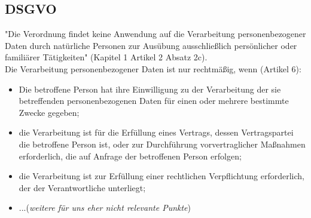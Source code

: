 \subsection{DSGVO}
 \cite{union2016verordnung}
"Die Verordnung findet keine Anwendung auf die Verarbeitung personenbezogener Daten  durch natürliche Personen zur Ausübung ausschließlich persönlicher oder familiärer Tätigkeiten" (Kapitel 1 Artikel 2 Absatz 2c).  \\



Die Verarbeitung personenbezogener Daten ist nur rechtmäßig, wenn (Artikel 6): 
\begin{itemize}
\item 	Die betroffene Person hat ihre Einwilligung zu der Verarbeitung der sie betreffenden personenbezogenen Daten für einen oder mehrere bestimmte Zwecke gegeben;
\item die Verarbeitung ist für die Erfüllung eines Vertrags, dessen Vertragspartei die betroffene Person ist, oder zur Durchführung vorvertraglicher Maßnahmen erforderlich, die auf Anfrage der betroffenen Person erfolgen;
\item die Verarbeitung ist zur Erfüllung einer rechtlichen Verpflichtung erforderlich, der der Verantwortliche unterliegt;
\item ...(\textit{weitere für uns eher nicht relevante Punkte})
\end{itemize}
 


